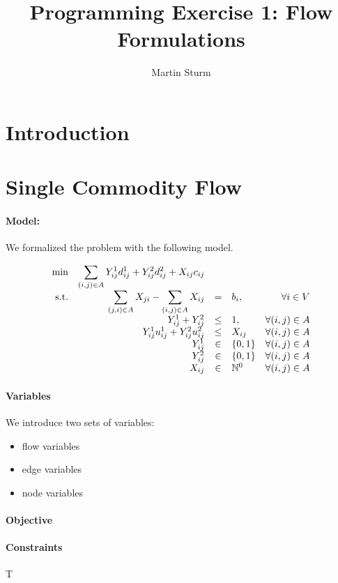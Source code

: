 \documentclass{article}
\begin{document}
\title{Programming Exercise 1: Flow Formulations}
\author{Martin Sturm}
\maketitle
              
\section{Introduction}

\section{Single Commodity Flow}

\paragraph{Model:} We formalized the problem with the following model.
\newcommand{\edgesum}{\displaystyle \sum_{(i, j) \in A}}
\newcommand{\edgesumrev}{\displaystyle \sum_{(j, i) \in A}}
\newcommand{\vflow}{X_{ij}}
\newcommand{\vflowrev}{X_{ji}}
\newcommand{\vmodeone}{Y_{ij}^1}
\newcommand{\vmodetwo}{Y_{ij}^2}
\newcommand{\binaries}{\{0, 1\}}
\newcommand{\nonnegint}{\mathbb{N}^0}

\begin{equation}
\begin{array}{r r c l r}
\displaystyle \min & \edgesum {\vmodeone d_{ij}^1 + \vmodetwo d_{ij}^2 + \vflow  c_{ij}} \\
\textrm{s.t.}  
& \edgesumrev {\vflowrev} - \edgesum {\vflow}& = & b_i,& \forall i \in V \\
& \vmodeone + \vmodetwo & \leq & 1, & \forall (i,j) \in A\\
& \vmodeone u_{ij}^1 + \vmodetwo u_{ij}^2 & \leq & \vflow &  \forall (i,j) \in A\\
& \vmodeone & \in & \binaries & \forall (i,j) \in A\\
& \vmodetwo & \in & \binaries & \forall (i,j) \in A\\
& \vflow & \in & \nonnegint  &  \forall (i,j) \in A\\
\end{array}
\end{equation}


\paragraph{Variables} We introduce two sets of variables:
\begin{itemize}
	\item flow variables
	\item edge variables
	\item node variables
\end{itemize}

\paragraph{Objective} 
\paragraph{Constraints} T
\end{document}
